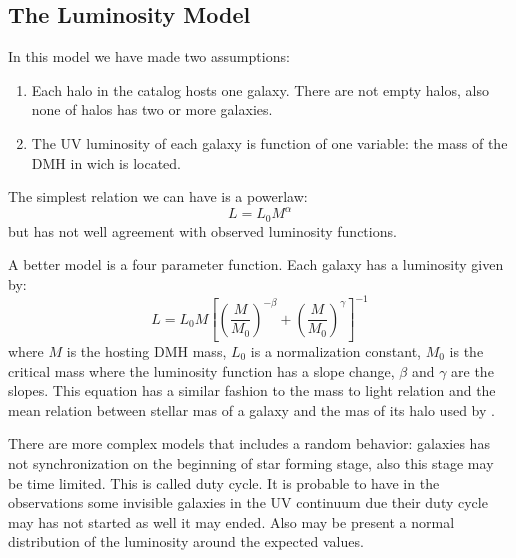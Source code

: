\subsection{The Luminosity Model}

In this model we have made two assumptions:
\begin{enumerate}
 \item Each halo in the catalog hosts one galaxy. There are not empty
halos, also none of halos has two or more galaxies.
 \item The UV luminosity of each galaxy is function of one variable: the mass of
the DMH in wich is located.
\end{enumerate}

The simplest relation we can have is a powerlaw:
 \begin{equation}
  L = L_0 M^\alpha
 \end{equation}
but has not well agreement with observed luminosity functions.

A better model is a four parameter function. Each galaxy has a luminosity given
by:
  \begin{equation}
  L = L_{0} M \left[ \left( \frac{M}{M_0}\right)^{-\beta} 
		   + \left( \frac{M}{M_0}\right)^{\gamma} 
               \right]^{-1}
  \end{equation}
where $M$ is the hosting DMH mass, $L_{0}$ is a normalization constant, $M_0$
is the critical mass where the luminosity function has a slope change, 
$\beta$ and $\gamma$ are the slopes. This equation has a similar fashion to the
mass to light relation \citep{vandenbosch03} and the mean relation between
stellar mas of a galaxy and the mas of its halo used by \cite{moster10}.

There are more complex models\citep{lee09} that includes a random behavior:
galaxies has not synchronization on the beginning of star forming stage, also
this stage may be time limited. This is called duty cycle. It is probable to
have in the observations some invisible galaxies in the UV continuum due their
duty cycle may has not started as well it may ended. Also may be present a
normal distribution of the luminosity around the expected values.